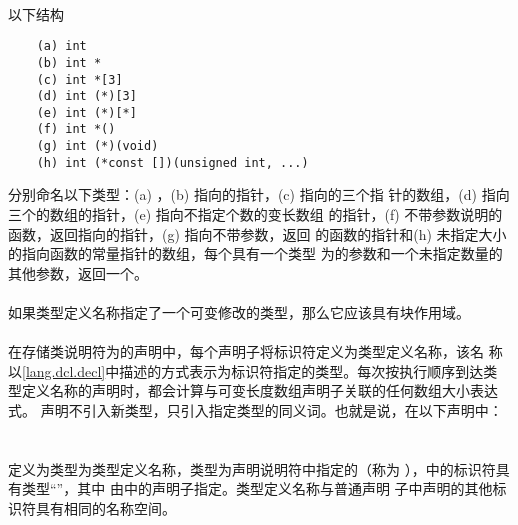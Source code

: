\paragraph{}
\ex* 以下结构
\begin{lstlisting}
    (a) int
    (b) int *
    (c) int *[3]
    (d) int (*)[3]
    (e) int (*)[*]
    (f) int *()
    (g) int (*)(void)
    (h) int (*const [])(unsigned int, ...)
\end{lstlisting}
分别命名以下类型：(a) ，(b) 指向的指针，(c) 指向的三个指
针的数组，(d) 指向三个的数组的指针，(e) 指向不指定个数的变长数组
的指针，(f) 不带参数说明的函数，返回指向的指针，(g) 指向不带参数，返回
的函数的指针和(h) 未指定大小的指向函数的常量指针的数组，每个具有一个类型
为的参数和一个未指定数量的其他参数，返回一个。

\syntax
\paragraph{}

\constraint
\paragraph{}
如果类型定义名称指定了一个可变修改的类型，那么它应该具有块作用域。

\semantic
\paragraph{}
在存储类说明符为的声明中，每个声明子将标识符定义为类型定义名称，该名
称以\ref{lang.dcl.decl}中描述的方式表示为标识符指定的类型。每次按执行顺序到达类
型定义名称的声明时，都会计算与可变长度数组声明子关联的任何数组大小表达式。
声明不引入新类型，只引入指定类型的同义词。也就是说，在以下声明中：\\
\mbox{\hspace{4em}}                                \\
\mbox{\hspace{4em}}                                        \\
定义为类型为类型定义名称，类型为声明说明符中指定的（称为
），中的标识符具有类型``”，其中
由中的声明子指定。类型定义名称与普通声明
子中声明的其他标识符具有相同的名称空间。

